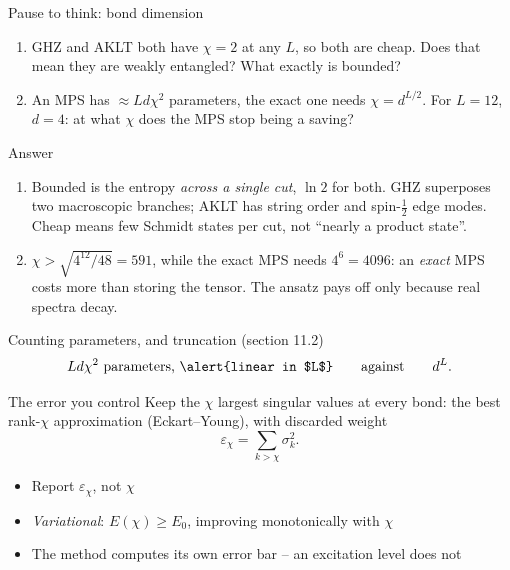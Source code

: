 \documentclass[aspectratio=169,10pt]{beamer}
\newcounter{thinkctr}
\newcommand{\thinkq}[2]{%
  \stepcounter{thinkctr}%
  \begin{tcolorbox}[colback=palewarm,colframe=warm,title={\bfseries Pause to think \#\thethinkctr\hfill\mdseries\small(about #1 min -- discuss with your neighbour)},fonttitle=\bfseries]
  #2
  \end{tcolorbox}}
\newcommand{\thinka}[1]{%
  \begin{tcolorbox}[colback=paleteal,colframe=teal,title={\bfseries Answer to pause \#\thethinkctr}]
  #1
  \end{tcolorbox}}
\begin{document}
\begin{frame}{Pause to think: bond dimension}
  \thinkq{4}{
  \begin{enumerate}
    \item GHZ and AKLT both have $\chi=2$ at any $L$, so both are cheap. Does that mean they are weakly entangled? What exactly is bounded?
    \item An MPS has $\approx Ld\chi^2$ parameters, the exact one needs $\chi=d^{L/2}$. For $L=12$, $d=4$: at what $\chi$ does the MPS stop being a saving?
  \end{enumerate}}
\end{frame}

\begin{frame}{Answer}
  \thinka{
  \begin{enumerate}
    \item Bounded is the entropy \emph{across a single cut}, $\ln2$ for both. GHZ superposes two macroscopic branches; AKLT has string order and spin-$\tfrac12$ edge modes. \alert{Cheap means few Schmidt states per cut, not ``nearly a product state''.}
    \item $\chi>\sqrt{4^{12}/48}=591$, while the exact MPS needs $4^6=4096$: an \emph{exact} MPS costs more than storing the tensor. The ansatz pays off only because real spectra decay.
  \end{enumerate}}
\end{frame}

\begin{frame}{Counting parameters, and truncation (section 11.2)}
  \[
    Ld\chi^2\ \text{parameters, \alert{linear in $L$}}
    \qquad\text{against}\qquad
    d^L .
  \]
  \begin{block}{The error you control}
    Keep the $\chi$ largest singular values at every bond: the best rank-$\chi$ approximation (Eckart--Young), with discarded weight
    \[
      \varepsilon_\chi=\sum_{k>\chi}\sigma_k^2 .
    \]
  \end{block}
  \begin{itemize}
    \item Report $\varepsilon_\chi$, not $\chi$
    \item \emph{Variational}: $E(\chi)\ge E_0$, improving monotonically with $\chi$
    \item \alert{The method computes its own error bar} -- an excitation level does not
  \end{itemize}
\end{frame}
\end{document}
